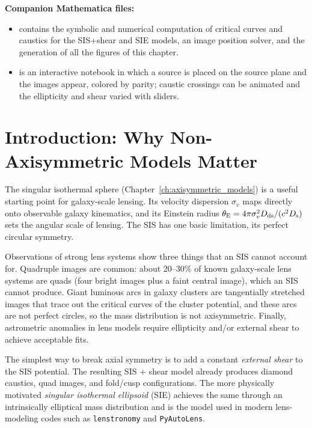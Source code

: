 \medskip
\noindent
\textbf{Companion Mathematica files:}
\begin{itemize}[nosep]
    \item {}
          contains the symbolic and numerical computation of critical
          curves and caustics for the SIS+shear and SIE models, an
          image position solver, and the generation of all the
          figures of this chapter.
    \item {}
          is an interactive notebook in which a source is placed on
          the source plane and the images appear, colored by parity;
          caustic crossings can be animated and the ellipticity and
          shear varied with sliders.
\end{itemize}


\section{Introduction: Why Non-Axisymmetric Models Matter}
\label{sec:elliptical_intro}

The singular isothermal sphere (Chapter~\ref{ch:axisymmetric_models}) is
a useful starting point for galaxy-scale lensing.  Its velocity
dispersion $\sigma_v$ maps directly onto observable galaxy kinematics,
and its Einstein radius $\theta_{\mathrm{E}} = 4\pi\sigma_v^2 D_{\mathrm{ds}}/(c^2
D_{\mathrm{s}})$ sets the angular scale of lensing.  The SIS has one basic
limitation, its perfect circular symmetry.

Observations of strong lens systems show three things that an SIS
cannot account for.  Quadruple images are common: about 20--30\% of
known galaxy-scale lens systems are quads (four bright images plus a
faint central image), which an SIS cannot produce.  Giant luminous
arcs in galaxy clusters are tangentially stretched images that trace
out the critical curves of the cluster potential, and these arcs are
not perfect circles, so the mass distribution is not axisymmetric.
Finally, astrometric anomalies in lens models require ellipticity
and/or external shear to achieve acceptable fits.

The simplest way to break axial symmetry is to add a constant
\emph{external shear} to the SIS potential.  The resulting
SIS + shear model already produces diamond caustics, quad images, and
fold/cusp configurations.  The more physically motivated
\emph{singular isothermal ellipsoid} (SIE) achieves the same through
an intrinsically elliptical mass distribution and is the model used
in modern lens-modeling codes such as \texttt{lenstronomy} and
\texttt{PyAutoLens}.


